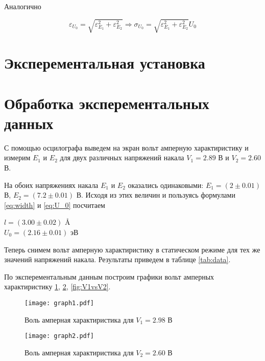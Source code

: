     Аналогично

    \begin{equation}
        \varepsilon_{U_0} = \sqrt{\varepsilon_{E_1}^2 + \varepsilon_{E_2}^2} \Rightarrow \sigma_{U_0} = \sqrt{\varepsilon_{E_1}^2 + \varepsilon_{E_2}^2} U_0
    \end{equation}

    \section*{Эксперементальная установка}

    \section*{Обработка эксперементальных данных}

    С помощью осцилографа выведем на экран вольт амперную характиристику и измерим $E_1$ и $E_2$
    для двух различных напряжений накала $V_1 = 2.89$ В и $V_2 = 2.60$ В.

    На обоих напряжениях накала $E_1$ и $E_2$ оказались одинаковыми: $E_1 = (2 \pm 0.01)$ В, $E_2 = (7.2 \pm 0.01)$ В.
    Исходя из этих величин и пользуясь формулами \eqref{eq:width} и \eqref{eq:U_0} посчитаем 

    \begin{center}
        $l = (3.00 \pm 0.02)$ \AA \\
        $U_0 = (2.16 \pm 0.01)$ эВ \\
    \end{center}

    Теперь снимем вольт амперную характиристику в статическом режиме для тех же значений напряжений накала.
    Результаты приведем в таблице \ref{tab:data}.

    

    По эксперементальным данным построим графики вольт амперных характиристику \ref{fig:V1}, \ref{fig:V2}, \ref{fig:V1vsV2}.

    \begin{figure}
        \centering
        \texttt{[image: graph1.pdf]}
        \caption{Воль амперная характиристика для $V_1 = 2.98$ В}
        \label{fig:V1}
    \end{figure}

    \begin{figure}
        \centering
        \texttt{[image: graph2.pdf]}
        \caption{Воль амперная характиристика для $V_2 = 2.60$ В}
        \label{fig:V2}
    \end{figure}

